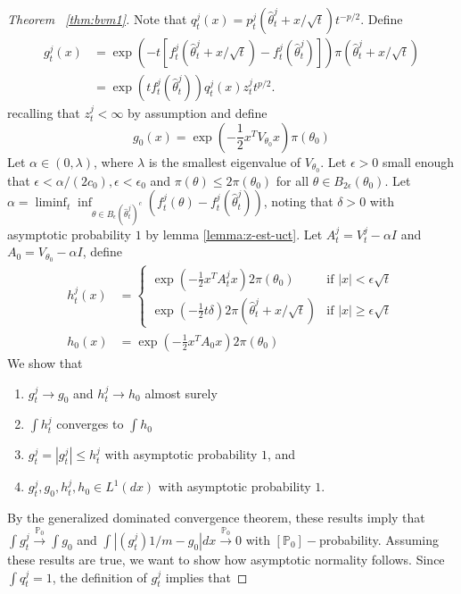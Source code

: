 \documentclass[twoside,11pt]{article}
\numberwithin{equation}{section}
\newcommand\bP{\mathbb{P}}
\newcommand{\pto}{\stackrel{\bP_0}{\to}}
\begin{document}
{\begin{proof}[Theorem ~\ref{thm:bvm1}]
Note that $q_t^j(x) = p_t^j(\hat\theta_t^j + x/\sqrt{t}) t^{-p/2}$. Define
\begin{align*}
    g_t^j(x) &= \exp(-t[f_t^j(\hat\theta_t^j+ x/\sqrt{t}) - f_t^j(\hat\theta_t^j)]) \pi(\hat\theta_t^j + x/\sqrt{t}) \\
    &= \exp(t f_t^j(\hat\theta_t^j)) q_t^j (x) z_t^j t^{p/2}. 
    \end{align*}
recalling that $z_t^j < \infty$ by assumption and define
\begin{equation*}
    g_0(x) = \exp(-\frac{1}{2} x^T V_{\theta_0} x) \pi(\theta_0)
\end{equation*}
Let $\alpha \in (0, \lambda)$, where $\lambda$ is the smallest eigenvalue of $V_{\theta_0}$. Let $\epsilon >0$ small enough that $\epsilon < \alpha/ (2 c_0), \epsilon < \epsilon_0$ and $\pi(\theta) \leq 2 \pi(\theta_0)$ for all $\theta \in B_{2 \epsilon}(\theta_0)$. Let $\alpha = \liminf_t \inf_{\theta \in B_\epsilon(\hat\theta_t^j)^c} (f_t^j(\theta) -f_t^j(\hat\theta_t^j))$, noting that $\delta > 0$ with asymptotic probability $1$ by lemma \ref{lemma:z-est-uct}. Let $A_t^j = V_t^j - \alpha I$ and $A_0 = V_{\theta_0} - \alpha I$, define
\begin{align*}
    h_t^j(x) &= \begin{cases} \exp(-\frac{1}{2} x^T A_t^j x) 2 \pi(\theta_0) & \mbox{if }|x| < \epsilon \sqrt{t} \\
\exp(-\frac{1}{2} t \delta) 2\pi(\hat\theta_t^j + x/\sqrt{t}) & \mbox{if }|x| \geq \epsilon \sqrt{t} \end{cases} \\
h_0(x) &= \exp(-\frac{1}{2}x^T A_0 x) 2\pi(\theta_0)
\end{align*}
We show that 
\begin{enumerate}
    \item $g_t^j \to g_0$ and $h_t^j \to h_0$ almost surely
    \item $\int h_t^j$ converges to $\int h_0$
    \item $g_t^j = |g_t^j| \leq h_t^j$ with asymptotic probability $1$, and 
    \item $g_t^j, g_0, h_t^j, h_0 \in L^1(dx)$ with asymptotic probability $1$. 
\end{enumerate}
By the generalized dominated convergence theorem, these results imply that $\int g_t^j \pto \int g_0$ and $\int |(g_t^j){1/m} - g_0| dx \pto 0$ with $[\bP_0]-$probability. Assuming these results are true, we want to show how asymptotic normality follows. Since $\int q_t^j = 1$, the definition of $g_t^j$ implies that 

\end{proof}}
\end{document}
